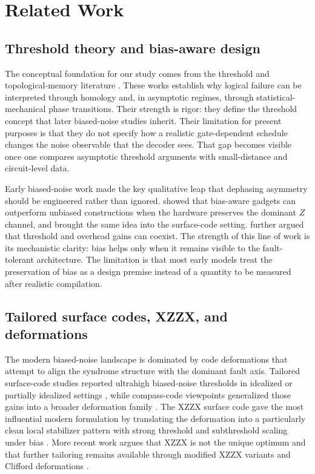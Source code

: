 \documentclass{article} %
\begin{document}
\section{Related Work}
\label{sec:related}

\subsection{Threshold theory and bias-aware design}

The conceptual foundation for our study comes from the threshold and topological-memory literature \citep{dennis2002_topological_memory,wang2003_confinement_higgs,kitaev2003_anyons}. These works establish why logical failure can be interpreted through homology and, in asymptotic regimes, through statistical-mechanical phase transitions. Their strength is rigor: they define the threshold concept that later biased-noise studies inherit. Their limitation for present purposes is that they do not specify how a realistic gate-dependent schedule changes the noise observable that the decoder sees. That gap becomes visible once one compares asymptotic threshold arguments with small-distance and circuit-level data.

Early biased-noise work made the key qualitative leap that dephasing asymmetry should be engineered rather than ignored. \citet{aliferis2008_biased_noise} showed that bias-aware gadgets can outperform unbiased constructions when the hardware preserves the dominant $Z$ channel, and \citet{stephens2013_topological_biased} brought the same idea into the surface-code setting. \citet{webster2015_reducing_overhead} further argued that threshold and overhead gains can coexist. The strength of this line of work is its mechanistic clarity: bias helps only when it remains visible to the fault-tolerant architecture. The limitation is that most early models treat the preservation of bias as a design premise instead of a quantity to be measured after realistic compilation.

\subsection{Tailored surface codes, XZZX, and deformations}

The modern biased-noise landscape is dominated by code deformations that attempt to align the syndrome structure with the dominant fault axis. Tailored surface-code studies reported ultrahigh biased-noise thresholds in idealized or partially idealized settings \citep{tuckett2018_ultrahigh_threshold,tuckett2019_tailoring_surface_codes}, while compass-code viewpoints generalized those gains into a broader deformation family \citep{li2019_compass_codes}. The XZZX surface code gave the most influential modern formulation by translating the deformation into a particularly clean local stabilizer pattern with strong threshold and subthreshold scaling under bias \citep{bonilla2021_xzzx}. More recent work argues that XZZX is not the unique optimum and that further tailoring remains available through modified XZZX variants and Clifford deformations \citep{xu2023_tailored_xzzx,dua2024_clifford_deformed}.
\end{document}
